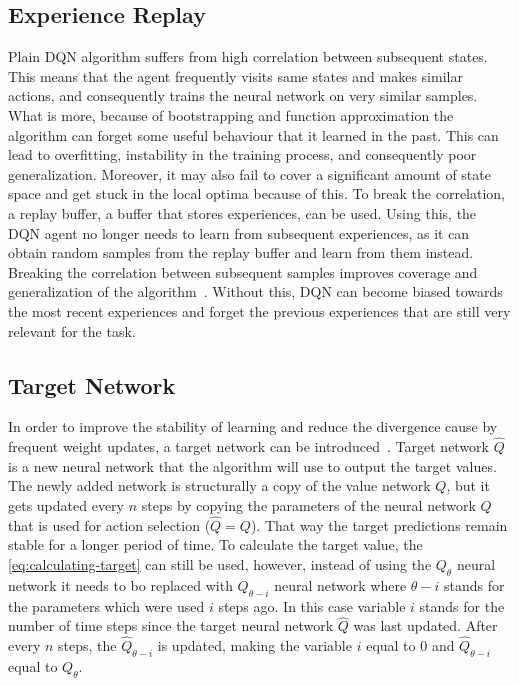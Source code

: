 \documentclass{article}
\begin{document}
\subsection{Experience Replay}
\label{subsec:experience-replay}
Plain DQN algorithm suffers from high correlation between subsequent states.
This means that the agent frequently visits same states and makes similar actions,
and consequently trains the neural network on very similar samples.
What is more, because of bootstrapping and function approximation the algorithm can forget some useful behaviour that it learned in the past.
This can lead to overfitting, instability in the training process, and consequently poor generalization.
Moreover, it may also fail to cover a significant amount of state space and get stuck
in the local optima because of this.
To break the correlation, a replay buffer, a buffer that stores experiences, can be used.
Using this, the DQN agent no longer needs to learn from subsequent experiences, as it can obtain random samples
from the replay buffer and learn from them instead.
Breaking the correlation between subsequent samples improves coverage and generalization of the algorithm~\cite{DBLP:books/sp/Plaat22}.
Without this, DQN can become biased towards the most recent experiences and forget the previous experiences
that are still very relevant for the task.

\subsection{Target Network}
\label{subsec:target-network}
In order to improve the stability of learning and reduce the divergence cause by frequent weight updates,
a target network can be introduced~\cite{DBLP:books/sp/Plaat22}.
Target network $\hat Q$ is a new neural network that the algorithm will use to output the target values.
The newly added network is structurally a copy of the value network $Q$, but it gets updated every $n$ steps
by copying the parameters of the neural network $Q$ that is used for action selection ($\hat Q = Q$).
That way the target predictions remain stable for a longer period of time.
To calculate the target value, the \autoref{eq:calculating-target} can still be used, however, instead of using the $Q_\theta$
neural network it needs to bo replaced with $Q_{\theta - i}$ neural network where $\theta - i$ stands for the parameters
which were used $i$ steps ago.
In this case variable $i$ stands for the number of time steps since the target neural network $\hat Q$ was last updated.
After every $n$ steps, the $\hat Q_{\theta - i}$ is updated, making the variable $i$ equal to 0 and $\hat Q_{\theta - i}$
equal to $Q_\theta$.
\end{document}
